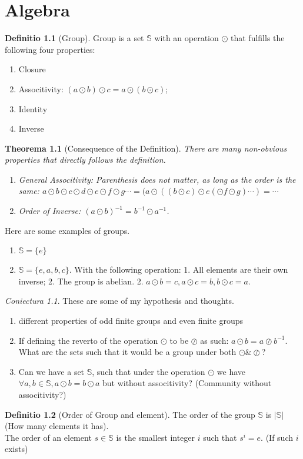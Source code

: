 \documentclass[12pt, a4paper]{report}
\newtheorem{theorem}{Theorema}[section]
\theoremstyle{definition}
\newtheorem{definition}{Definitio}[section]
\theoremstyle{definition}
\theoremstyle{remark}
\newtheorem{hypothesis}{Coniectura}[section]
\begin{document}
\chapter{Algebra}

\begin{definition}[Group]
Group is a set $\mathbb{S}$ with an operation $\odot$ that fulfills the following four properties:
\begin{enumerate}
	\item Closure
	\item Associtivity: $(a \odot b) \odot c = a \odot (b \odot c)$;
	\item Identity
	\item Inverse
\end{enumerate}
\end{definition}
\begin{theorem}[Consequence of the Definition]
There are many non-obvious properties that directly follows the definition.
\begin{enumerate}
	\item General Associtivity: Parenthesis does not matter, as long as the order is the same: 
		$a \odot b \odot c \odot d \odot e \odot f \odot g \cdots  = (a \odot ((b \odot c) \odot e (\odot f \odot g)\cdots) = \cdots$
	\item Order of Inverse: $(a \odot b)^{-1}=b^{-1}\odot a^{-1}$.  
\end{enumerate}
\end{theorem}

Here are some examples of groups. 
\begin{enumerate}
	\item $\mathbb{S}=\{e\}$
	\item $\mathbb{S} = \{e, a, b, c\}.$ With the following operation:
		1. All elements are their own inverse; 
		2. The group is abelian.
		2. $a \odot b = c, a \odot c = b, b \odot c = a$.
\end{enumerate}
\begin{hypothesis}
	These are some of my hypothesis and thoughts.
	\begin{enumerate}
		\item different properties of odd finite groups and even finite groups
		\item If defining the reverto of the operation $\odot $ to be $\oslash $ as such: $a \odot b = a \oslash b^{-1}$. What are the sets such that it would be a group under both $\odot \& \oslash$?
		\item Can we have a set $\mathbb{S}$, such that under the operation $\odot $ we have $\forall a, b \in \mathbb{S}, a \odot b = b \odot  a$ but without associtivity? (Community without associtivity?)
	\end{enumerate}
\end{hypothesis}
\begin{definition}[Order of Group and element]
The order of the group $\mathbb{S}$ is $|\mathbb{S}|$ (How many elements it has). \\
The order of an element $s \in \mathbb{S}$ is the smallest integer $i$ such that $s^i = e.$ (If such $i$ exists)
\end{definition}
\end{document}
